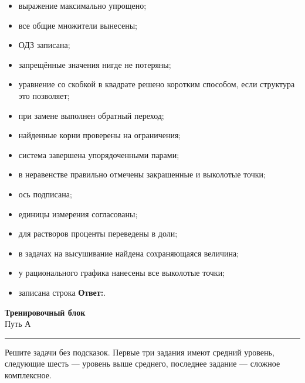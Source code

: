 \documentclass[a4paper,12pt]{article}
\begin{document}
\begin{itemize}
    \item выражение максимально упрощено;
    \item все общие множители вынесены;
    \item ОДЗ записана;
    \item запрещённые значения нигде не потеряны;
    \item уравнение со скобкой в квадрате решено коротким способом, если структура это позволяет;
    \item при замене выполнен обратный переход;
    \item найденные корни проверены на ограничения;
    \item система завершена упорядоченными парами;
    \item в неравенстве правильно отмечены закрашенные и выколотые точки;
    \item ось подписана;
    \item единицы измерения согласованы;
    \item для растворов проценты переведены в доли;
    \item в задачах на высушивание найдена сохраняющаяся величина;
    \item у рационального графика нанесены все выколотые точки;
    \item записана строка \textbf{Ответ:}.
\end{itemize}


\newpage

\thispagestyle{fancy}

\begin{center}
{\LARGE\bfseries\textcolor{darkaccent}{Тренировочный блок}}\\[0.3em]
{\large Путь А}
\end{center}

{\color{accent}\rule{\linewidth}{0.8pt}}

\vspace{0.6em}

Решите задачи без подсказок. Первые три задания имеют средний уровень, следующие шесть --- уровень выше среднего, последнее задание --- сложное комплексное.
\end{document}
